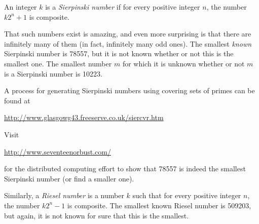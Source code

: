 \documentclass[12pt]{article}
\newcommand{\<}{\langle}
\renewcommand{\>}{\rangle}
\begin{document}
An integer $k$ is a \emph{Sierpinski number} if for every positive integer $n$, the number $k2^n+1$ is composite.

That such numbers exist is amazing, and even more surprising is that there are infinitely many of them (in fact, infinitely many odd ones).  The smallest \emph{known} Sierpinski number is 78557, but it is not known whether or not this is the smallest one.  The smallest number $m$ for which it 
is unknown whether or not $m$ is a Sierpinski number is 10223.

A process for generating Sierpinski numbers using covering sets of primes can be found at

\url{http://www.glasgowg43.freeserve.co.uk/siercvr.htm}

Visit

\url{http://www.seventeenorbust.com/}

for the distributed computing effort to show that 78557 is indeed the smallest Sierpinski number (or find a smaller one).

Similarly, a \emph{Riesel number} is a number $k$ such that for every positive integer $n$, the number $k2^n-1$ is composite.  The smallest known Riesel number is 509203, but again, it is not known for sure that this is the smallest.
\end{document}
